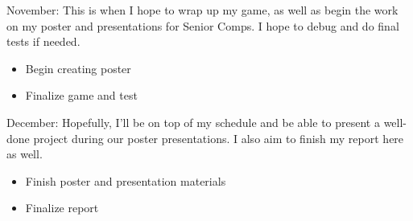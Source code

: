 \documentclass[10pt,twocolumn]{article}
\begin{document}
November:
This is when I hope to wrap up my game, as well as begin the work on my poster and presentations for Senior Comps. I hope to debug and do final tests if needed.
\begin{itemize}
\item Begin creating poster
\item Finalize game and test
\end{itemize}

December:
Hopefully, I'll be on top of my schedule and be able to present a well-done project during our poster presentations. I also aim to finish my report here as well.
\begin{itemize}
\item Finish poster and presentation materials
\item Finalize report
\end{itemize}


\appendix

\printbibliography
\end{document}
